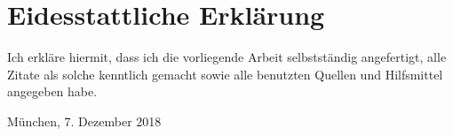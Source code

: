 


\cleardoublepage



\cleardoublepage


\section*{Eidesstattliche Erklärung}


\noindent Ich erkläre hiermit, dass ich die vorliegende Arbeit
selbstständig angefertigt, alle Zitate als solche kenntlich gemacht
sowie alle benutzten Quellen und Hilfsmittel angegeben habe.

\vspace{7ex}
\noindent\makebox[9.3cm]{\dotfill}

\smallskip\noindent München, 7. Dezember 2018


\cleardoublepage




\cleardoublepage



\cleardoublepage
\cleardoublepage

\pagestyle{fancy}
\setcounter{page}{1}